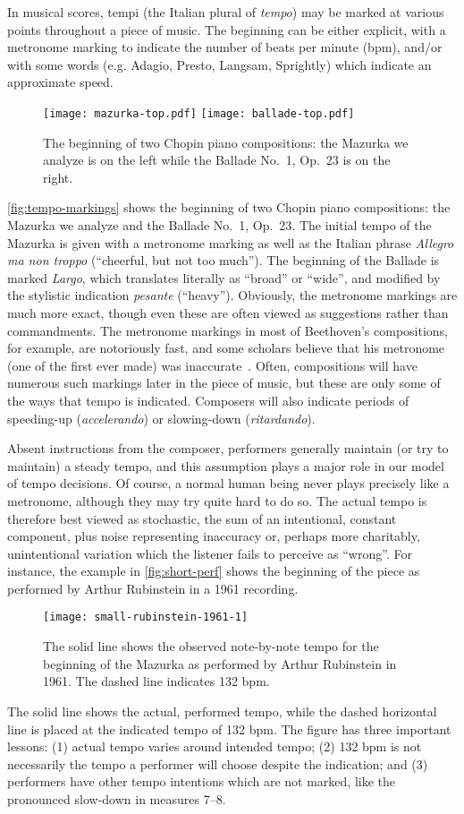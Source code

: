 \documentclass[12pt]{article}
\begin{document}
In musical scores, tempi (the Italian plural of {\em tempo}) may be
marked at various points throughout a piece of music. The
beginning can be either explicit, with a metronome marking to
indicate the number of beats per minute (bpm), and/or with some words
(e.g. Adagio, Presto, Langsam, Sprightly) which indicate an
approximate speed. 
\begin{figure}[t!]
  \centering
  \texttt{[image: mazurka-top.pdf]}
  \texttt{[image: ballade-top.pdf]}
  \caption{The beginning of two Chopin piano compositions: the Mazurka
    we analyze is on the left while the Ballade No.\ 1, Op.\ 23 is on
    the right.}
  \label{fig:tempo-markings}
\end{figure}
\autoref{fig:tempo-markings} shows the beginning of two Chopin piano
compositions: the Mazurka we analyze and the Ballade No.\ 1, Op.\ 23. The initial tempo of the Mazurka is given with a metronome
marking as well as the Italian phrase {\em Allegro ma non troppo}
(``cheerful, but not too much''). The beginning of the Ballade is 
marked {\em Largo}, which translates literally as ``broad'' or
``wide'', and modified by the stylistic indication {\em pesante}
(``heavy''). Obviously, the metronome markings are much more exact,
though even these are often viewed as suggestions rather than
commandments. The metronome markings in most of Beethoven's
compositions, for example, are notoriously fast, and some scholars
believe that his metronome (one of the first ever made) was
inaccurate~\citep{ForsenGray2013}. Often, compositions will have numerous such markings later
in the piece of music, but these are only some of the ways that tempo
is indicated. Composers will also indicate periods of speeding-up
(\emph{accelerando}) or
slowing-down (\emph{ritardando}).

Absent instructions from the composer, performers generally maintain
(or try to maintain) a steady tempo, and this assumption plays a major
role in our model of tempo decisions. Of course, a normal human being
never plays precisely like a 
metronome, although they may try quite hard to do so. The actual
tempo is therefore best viewed as stochastic, the sum of an
intentional, constant component, plus noise representing inaccuracy
or, perhaps more charitably, unintentional variation which the
listener fails to perceive as ``wrong''. For instance, the example in
\autoref{fig:short-perf} shows the beginning of the piece as performed
by Arthur Rubinstein in a 1961 recording. 
\begin{figure}[t!]
 \centering
 \texttt{[image: small-rubinstein-1961-1]}
 \caption{The solid line shows the observed note-by-note tempo for
   the beginning of the Mazurka as performed by Arthur Rubinstein in
   1961. The dashed line indicates 132 bpm.}
 \label{fig:short-perf}
\end{figure}
The solid line shows the
actual, performed tempo, while the dashed horizontal line is placed at
the indicated tempo of 132 bpm. The figure has three important
lessons: (1) actual tempo varies around intended tempo; (2) 132 bpm is
not necessarily the tempo a performer will choose despite the
indication; and (3) performers have other tempo intentions which are
not marked, like the pronounced slow-down in measures 7--8.
\end{document}
